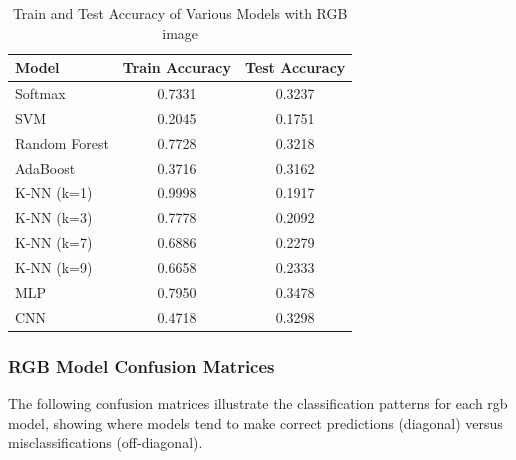 \documentclass{article}
\begin{document}
\begin{table}[htbp] %
    \centering
    \begin{tabular}{lcc}
        \toprule
        Model & Train Accuracy & Test Accuracy \\
        \toprule
        Softmax & 0.7331 & 0.3237 \\
        \midrule
        SVM & 0.2045 & 0.1751 \\
        \midrule
        Random Forest & 0.7728 & 0.3218 \\
        \midrule
        AdaBoost & 0.3716 & 0.3162 \\
        \midrule
        K-NN (k=1) & 0.9998 & 0.1917 \\
        \midrule
        K-NN (k=3) & 0.7778 & 0.2092 \\
        \midrule
        K-NN (k=7) & 0.6886 & 0.2279 \\
        \midrule
        K-NN (k=9) & 0.6658 & 0.2333 \\
        \midrule
        MLP & 0.7950 & 0.3478 \\
        \midrule
        CNN & 0.4718 & 0.3298 \\
        \bottomrule
    \end{tabular}
    \caption{Train and Test Accuracy of Various Models with RGB image}
    \label{tab:RGB scores}
\end{table}
\FloatBarrier 

\subsubsection{RGB Model Confusion Matrices}

The following confusion matrices illustrate the classification patterns for each rgb model, showing where models tend to make correct predictions (diagonal) versus misclassifications (off-diagonal).
\end{document}
